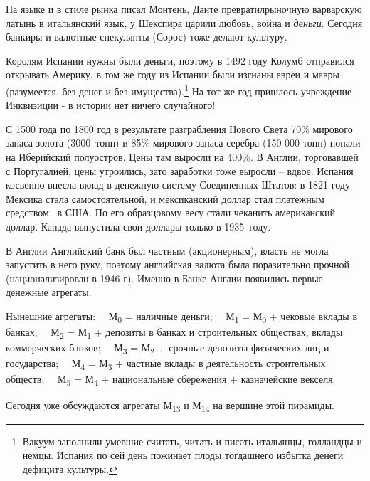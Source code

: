 На языке и в стиле рынка писал Монтень, Данте \flqq превратил\frqq рыночную варварскую латынь в
итальянский язык, у Шекспира царили любовь, война и \textit{деньги}. Сегодня банкиры и валютные спекулянты (Сорос) тоже
\flqq делают культуру\frqq.


Королям Испании нужны были деньги, поэтому в 1492 году Колумб отправился \flqq открывать
Америку\frqq, в том же году из Испании были изгнаны евреи и мавры (разумеется, без денег и без
имущества).\footnote{Вакуум заполнили умевшие считать, читать и писать итальянцы, голландцы и немцы.
Испания по сей день пожинает плоды тогдашнего \flqq избытка денег\frqq и дефицита культуры.} На тот
же год пришлось учреждение Инквизиции - в истории нет ничего случайного!


С 1500 года по 1800 год в результате разграбления Нового Света 70\% мирового запаса золота (3000~тонн) и 85\% мирового
запаса серебра (150 000 тонн) попали на Иберийский полуостров. Цены там выросли на 400\%. В Англии, торговавшей с
Португалией, цены утроились, зато заработки тоже выросли – вдвое. Испания косвенно внесла вклад в денежную систему
Соединенных Штатов: в 1821 году Мексика стала самостоятельной, и мексиканский доллар стал платежным средством \ в США.
По его образцовому весу стали чеканить американский доллар. Канада выпустила свои доллары только в 1935~году.


В Англии Английский банк был частным (акционерным), власть не могла запустить в него руку, поэтому английская валюта
была поразительно прочной (национализирован в 1946 г). Именно в Банке Англии появились первые денежные агрегаты.


Нынешние агрегаты:\newline
\ \ М\textsubscript{0} = наличные деньги;\newline
\ \ М\textsubscript{1} = М\textsubscript{0} + чековые вклады в банках;\newline
\ \ М\textsubscript{2} = М\textsubscript{1} + депозиты в банках и строительных обществах, вклады коммерческих
банков;\newline
\ \ М\textsubscript{3} = М\textsubscript{2} + срочные депозиты физических лиц и государства;\newline
\ \ М\textsubscript{4} = М\textsubscript{3} + частные вклады в деятельность строительных обществ;\newline
\ \ М\textsubscript{5} = М\textsubscript{4} + национальные сбережения + казначейские векселя.


Сегодня уже обсуждаются агрегаты М\textsubscript{13} и М\textsubscript{14} на вершине этой пирамиды.


